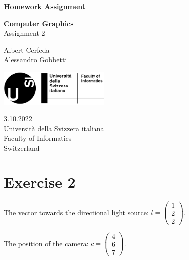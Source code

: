 \documentclass[tikz,14pt,fleqn]{article}
\newcommand\namesurname{Albert Cerfeda\\Alessandro Gobbetti}
\newcommand\assignment{Assignment 2}
\newcommand\subject{Computer Graphics}
\newcommand\documentdate{3.10.2022}
\begin{document}
\begin{titlepage}
   \begin{center}
       \vspace*{1cm}

       \textbf{\Large{Homework Assignment}}

       \vspace{0.5cm}
        \textbf{\subject}\\[5mm]
       \assignment
        
            
       \vspace{1.8cm}

        \namesurname
       \tableofcontents

       \vspace*{\fill}
     
       \includegraphics[width=0.4\textwidth]{fig/logo.png}
       
        \documentdate \\
        Università della Svizzera italiana\\
        Faculty of Informatics\\
        Switzerland\\

   \end{center}
\end{titlepage}


\section{Exercise 2}

The vector towards the directional light source: $ l = \begin{pmatrix} 1 \\ 2 \\ 2 \end{pmatrix}$.

The position of the camera: $c = \begin{pmatrix} 4 \\ 6 \\ 7 \end{pmatrix}$.
\end{document}
